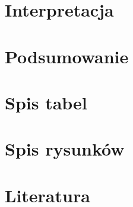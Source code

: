 \documentclass{article}
\begin{document}
\section{Interpretacja}

\section{Podsumowanie}

\section{Spis tabel}

\section{Spis rysunków}

\newpage
\section{Literatura}
\printbibliography
\end{document}
